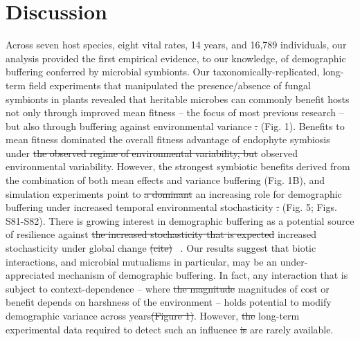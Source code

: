 \documentclass[lineno, sn-basic]{sn-jnl}%
\providecommand{\DIFadd}[1]{{\protect\color{blue}#1}} %
\providecommand{\DIFdel}[1]{{\protect\color{red}\protect\scriptsize\sout{#1}}}
\providecommand{\DIFadd}[1]{{\protect\color{blue}\uwave{#1}}} %
\providecommand{\DIFdel}[1]{{\protect\color{red}\sout{#1}}}                      %
\providecommand{\DIFaddbegin}{} %
\providecommand{\DIFaddend}{} %
\providecommand{\DIFdelbegin}{} %
\providecommand{\DIFdelend}{} %
\newcommand{\DIFscaledelfig}{0.5}
\newlength{\DIFdelgraphicswidth} %
\newlength{\DIFdelgraphicsheight} %
\newcommand{\DIFaddincludegraphics}[2][]{{\color{blue}\fbox{\DIFOincludegraphics[#1]{#2}}}} %
\newcommand{\DIFdelincludegraphics}[2][]{%
\sbox{\DIFdelgraphicsbox}{\DIFOincludegraphics[#1]{#2}}%
\settoboxwidth{\DIFdelgraphicswidth}{\DIFdelgraphicsbox} %
\settoboxtotalheight{\DIFdelgraphicsheight}{\DIFdelgraphicsbox} %
\scalebox{\DIFscaledelfig}{%
\parbox[b]{\DIFdelgraphicswidth}{\usebox{\DIFdelgraphicsbox}\\[-\baselineskip] \rule{\DIFdelgraphicswidth}{0em}}\llap{\resizebox{\DIFdelgraphicswidth}{\DIFdelgraphicsheight}{%
\setlength{\unitlength}{\DIFdelgraphicswidth}%
\begin{picture}(1,1)%
\thicklines\linethickness{2pt} %
{\color[rgb]{1,0,0}\put(0,0){\framebox(1,1){}}}%
{\color[rgb]{1,0,0}\put(0,0){\line( 1,1){1}}}%
{\color[rgb]{1,0,0}\put(0,1){\line(1,-1){1}}}%
\end{picture}%
}\hspace*{3pt}}} %
} %
\DeclareRobustCommand{\DIFaddbegin}{\DIFOaddbegin \let\includegraphics\DIFaddincludegraphics} %
\DeclareRobustCommand{\DIFaddend}{\DIFOaddend \let\includegraphics\DIFOincludegraphics} %
\DeclareRobustCommand{\DIFdelbegin}{\DIFOdelbegin \let\includegraphics\DIFdelincludegraphics} %
\DeclareRobustCommand{\DIFdelend}{\DIFOaddend \let\includegraphics\DIFOincludegraphics} %
\begin{document}
\section*{Discussion}
Across seven host species, eight vital rates, 14 years, and 16,789 individuals, our analysis provided the first empirical evidence, to our knowledge, of demographic buffering conferred by microbial symbionts. 
Our taxonomically-replicated, long-term field experiments that manipulated the presence/absence of fungal symbionts in plants revealed that heritable microbes can commonly benefit hosts not only through improved mean fitness -- the focus of most previous research -- but also through buffering against environmental variance \DIFdelbegin \DIFdel{. 
}\DIFdelend \DIFaddbegin \DIFadd{(Fig. 1). 
}\DIFaddend Benefits to mean fitness dominated the overall fitness advantage of endophyte symbiosis under \DIFdelbegin \DIFdel{the observed regime of environmental variability, but }\DIFdelend \DIFaddbegin \DIFadd{observed environmental variability. 
However, the strongest symbiotic benefits derived from the combination of both mean effects and variance buffering (Fig. 1B), and }\DIFaddend simulation experiments point to \DIFdelbegin \DIFdel{a dominant }\DIFdelend \DIFaddbegin \DIFadd{an increasing }\DIFaddend role for demographic buffering under increased temporal environmental stochasticity \DIFdelbegin \DIFdel{. 
}\DIFdelend \DIFaddbegin \DIFadd{(Fig. 5; Figs. S81-S82).
}\DIFaddend There is growing interest in demographic buffering as a potential source of resilience against \DIFdelbegin \DIFdel{the increased stochasticity that is expected }\DIFdelend \DIFaddbegin \DIFadd{increased stochasticity }\DIFaddend under global change \DIFdelbegin \DIFdel{(cite)}\DIFdelend \DIFaddbegin \DIFadd{\mbox{%
\citep{hilde_demographic_2020}}\hspace{0pt}%
}\DIFaddend . 
Our results suggest that biotic interactions, and microbial mutualisms in particular, may be an under-appreciated mechanism of demographic buffering. 
In fact, any interaction that is subject to context-dependence -- where \DIFdelbegin \DIFdel{the magnitude }\DIFdelend \DIFaddbegin \DIFadd{magnitudes }\DIFaddend of cost or benefit depends on harshness of the environment -- holds potential to modify demographic variance across years\DIFdelbegin \DIFdel{(Figure 1)}\DIFdelend . 
However, \DIFdelbegin \DIFdel{the }\DIFdelend long-term experimental data required to detect such an influence \DIFdelbegin \DIFdel{is }\DIFdelend \DIFaddbegin \DIFadd{are }\DIFaddend rarely available. 
\end{document}

